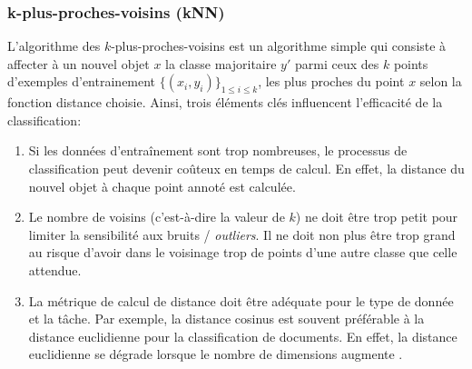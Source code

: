\subsubsection{k-plus-proches-voisins (kNN)}
L'algorithme des $k$-plus-proches-voisins \citep{cover1967knn} est un algorithme simple qui consiste à affecter à un nouvel objet $x$ la classe majoritaire $y'$ parmi ceux des $k$ points d'exemples d'entrainement $\lbrace (x_i,y_i) \rbrace_{1\leq i \leq k}$, les plus proches du point $x$ selon la fonction distance choisie. Ainsi, trois éléments clés influencent l'efficacité de la classification:
\begin{enumerate}
	\item Si les données d'entraînement sont trop nombreuses, le processus de classification peut devenir coûteux en temps de calcul. En effet, la distance du nouvel objet à chaque point annoté est calculée.
	\item Le nombre de voisins (c'est-à-dire la valeur de $k$) ne doit être trop petit pour limiter la sensibilité aux bruits / \textit{outliers}. Il ne doit non plus être trop grand au risque d'avoir dans le voisinage trop de points d'une autre classe que celle attendue. 
	
	
	 
	\item La métrique de calcul de distance doit être adéquate pour le type de donnée et la tâche. Par exemple, la distance cosinus est souvent préférable à la distance euclidienne pour la classification de documents. En effet, la distance euclidienne se dégrade lorsque le nombre de dimensions augmente \citep{sohangir2017improvedCosSim, aggarwal2001behaviorOfDistHighDim}.
\end{enumerate}

